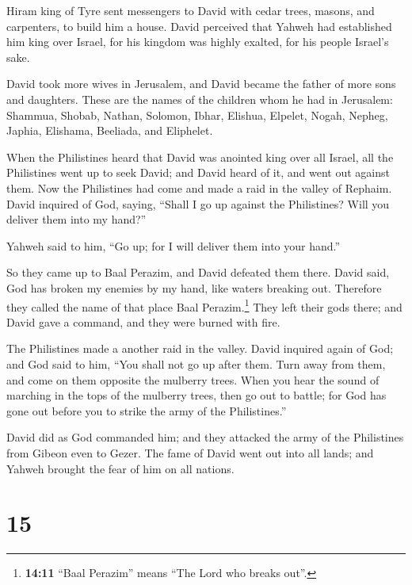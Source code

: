  Hiram king of Tyre sent messengers to David with cedar
trees, masons, and carpenters, to build him a house. 
David perceived that Yahweh had established him king over Israel, for
his kingdom was highly exalted, for his people Israel's sake.

 David took more wives in Jerusalem, and David became the
father of more sons and daughters.  These are the names of
the children whom he had in Jerusalem: Shammua, Shobab, Nathan, Solomon,
 Ibhar, Elishua, Elpelet,  Nogah, Nepheg,
Japhia,  Elishama, Beeliada, and Eliphelet.

 When the Philistines heard that David was anointed king
over all Israel, all the Philistines went up to seek David; and David
heard of it, and went out against them.  Now the
Philistines had come and made a raid in the valley of Rephaim.
 David inquired of God, saying, ``Shall I go up against
the Philistines? Will you deliver them into my hand?''

Yahweh said to him, ``Go up; for I will deliver them into your hand.''

 So they came up to Baal Perazim, and David defeated them
there. David said, God has broken my enemies by my hand, like waters
breaking out. Therefore they called the name of that place Baal
Perazim.\footnote{\textbf{14:11} ``Baal Perazim'' means ``The Lord who
  breaks out''.}  They left their gods there; and David
gave a command, and they were burned with fire.

 The Philistines made a another raid in the valley.
 David inquired again of God; and God said to him, ``You
shall not go up after them. Turn away from them, and come on them
opposite the mulberry trees.  When you hear the sound of
marching in the tops of the mulberry trees, then go out to battle; for
God has gone out before you to strike the army of the Philistines.''

 David did as God commanded him; and they attacked the
army of the Philistines from Gibeon even to Gezer.  The
fame of David went out into all lands; and Yahweh brought the fear of
him on all nations.

\hypertarget{section-14}{%
\section{15}\label{section-14}}

